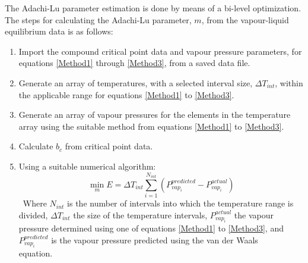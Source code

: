 The Adachi-Lu parameter estimation is done by means of a bi-level optimization. The steps for calculating the Adachi-Lu parameter, $m$, from the vapour-liquid equilibrium data is as follows:\
\begin{enumerate}
\item Import the compound critical point data and vapour pressure parameters, for equations \ref{Method1} through \ref{Method3}, from a saved data file.\
\item Generate an array of temperatures, with a selected interval size, $\Delta T_{int}$, within the applicable range for equations \ref{Method1} to \ref{Method3}.\label{TrangeStep}\
\item Generate an array of vapour pressures for the elements in the temperature array using the suitable method from equations \ref{Method1} to \ref{Method3}.\
\item Calculate $b_{c}$ from critical point data.\
\item Using a suitable numerical algorithm:\label{mOptimization}\
\begin{equation}
\min_{m} E = \Delta T_{int}\sum_{i =1}^{N_{int}} \left(P_{vap_{i}}^{predicted} - P_{vap_{i}}^{actual}\right) \label{mGoalFunction}
\end{equation}\
Where $N_{int}$ is the number of intervals into which the temperature range is divided, $\Delta T_{int}$ the size of the temperature intervals, $P_{vap_{i}}^{actual}$ the vapour pressure determined using one of equations \ref{Method1} to \ref{Method3}, and $P_{vap_{i}}^{predicted}$ is the vapour pressure predicted using the van der Waals equation.\
\
\
\
\


\end{enumerate}
